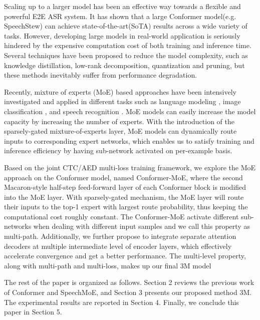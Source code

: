 \documentclass[a4paper]{article}
\begin{document}
Scaling up to a larger model has been an effective way towards a flexible and powerful E2E ASR system. It has shown that a large Conformer model(e.g. SpeechStew\cite{chan2021speechstew}) can achieve state-of-the-art(SoTA) results across a wide variety of tasks. However, developing large models in real-world application is seriously hindered by the expensive computation cost of both training and inference time. Several techniques have been proposed to reduce the model complexity, such as knowledge distillation, low-rank decomposition, quantization and pruning, but these methods inevitably suffer from performance degradation.




Recently, mixture of experts (MoE) based approaches \cite{jacobs1991adaptive, jordan1994hierarchical} have been intensively investigated and applied in different tasks such as language modeling \cite{lepikhin2020gshard, fedus2021switch}, image classification \cite{gross2017hard, ahmed2016network, wang2020deep, cai2021dynamic}, and speech recognition \cite{you2021speechmoe,you2021speechmoe2}.
MoE models can easily increase the model capacity by increasing the number of experts. With the introduction of the sparsely-gated mixture-of-experts layer\cite{shazeer2017outrageously}, MoE models can dynamically route inputs to corresponding expert networks, which enables us to satisfy training and inference efficiency by having sub-network activated on per-example basis.


Based on the joint CTC/AED multi-loss training framework, we explore the MoE approach on the Conformer model, named Conformer-MoE, where the second Macaron-style half-step feed-forward layer of each Conformer block is modified into the MoE layer. With sparsely-gated mechanism, the MoE layer will route their inputs to the top-1 expert with largest route probability, thus keeping the computational cost roughly constant. The Conformer-MoE activate different sub-networks when dealing with different input samples and we call this property as multi-path. Additionally, we further propose to integrate separate attention decoders at multiple intermediate level of encoder layers, which effectively accelerate convergence and get a better performance. The multi-level property, along with multi-path and multi-loss, makes up our final 3M model




The rest of the paper is organized as follows. Section 2 reviews the previous work of Conformer and SpeechMoE, and Section 3 presents our proposed method 3M. The experimental results are reported in Section 4. Finally, we conclude this paper in Section 5.
\end{document}
